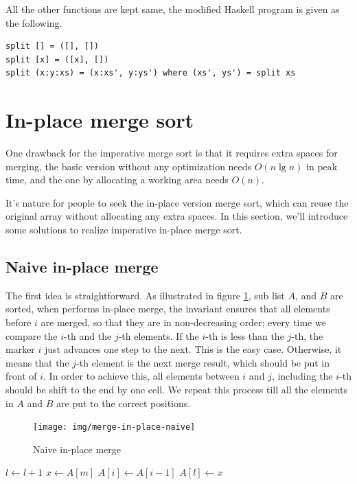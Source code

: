 \documentclass[b5paper]{article}
\begin{document}
All the other functions are kept same, the modified Haskell program is given as the following.

\lstset{language=Haskell}
\begin{lstlisting}
split [] = ([], [])
split [x] = ([x], [])
split (x:y:xs) = (x:xs', y:ys') where (xs', ys') = split xs
\end{lstlisting}

\section{In-place merge sort}
One drawback for the imperative merge sort is that it requires extra spaces for merging, the basic version without
any optimization needs $O(n \lg n)$ in peak time, and the one by allocating a working area needs $O(n)$.

It's nature for people to seek the in-place version merge sort, which can reuse the original array without allocating
any extra spaces. In this section, we'll introduce some solutions to realize imperative in-place merge sort.

\subsection{Naive in-place merge}
The first idea is straightforward. As illustrated in figure \ref{fig:merge-in-place-naive}, sub list $A$, and $B$
are sorted, when performs in-place merge, the invariant ensures that all elements before $i$ are merged, so that
they are in non-decreasing order; every time we compare the $i$-th and the $j$-th elements. If the $i$-th is less
than the $j$-th, the marker $i$ just advances one step to the next. This is the easy case. Otherwise, it
means that the $j$-th element is the next merge result, which should be put in front of $i$. In order
to achieve this, all elements between $i$ and $j$, including the $i$-th should be shift to the end by one cell.
We repeat this process till all the elements in $A$ and $B$ are put to the correct positions.

\begin{figure}[htbp]
 \centering
 \texttt{[image: img/merge-in-place-naive]}
 \caption{Naive in-place merge}
 \label{fig:merge-in-place-naive}
\end{figure}

\begin{algorithmic}[1]
      \State $l \gets l + 1$
    \Else
      \State $x \gets A[m]$
       
        \State $A[i] \gets A[i-1]$
      \EndFor
      \State $A[l] \gets x$
    \EndIf
  \EndWhile
\EndProcedure
\end{algorithmic}
\end{document}
